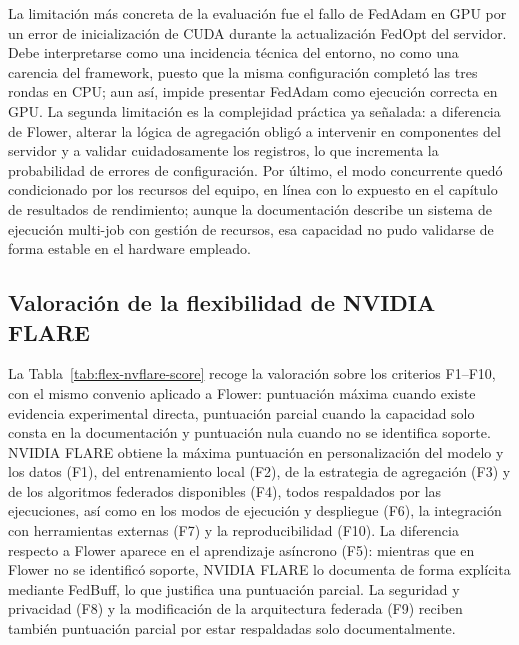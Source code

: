 La limitación más concreta de la evaluación fue el fallo de FedAdam en GPU por un
error de inicialización de CUDA durante la actualización FedOpt del servidor. Debe
interpretarse como una incidencia técnica del entorno, no como una carencia del
framework, puesto que la misma configuración completó las tres rondas en CPU; aun
así, impide presentar FedAdam como ejecución correcta en GPU. La segunda limitación
es la complejidad práctica ya señalada: a diferencia de Flower, alterar la lógica de
agregación obligó a intervenir en componentes del servidor y a validar
cuidadosamente los registros, lo que incrementa la probabilidad de errores de
configuración. Por último, el modo concurrente quedó condicionado por los recursos
del equipo, en línea con lo expuesto en el capítulo de resultados de rendimiento;
aunque la documentación describe un sistema de ejecución multi-job con gestión de
recursos, esa capacidad no pudo validarse de forma estable en el hardware empleado.

\subsection{Valoración de la flexibilidad de NVIDIA FLARE}\label{subsec:flex-nvflare-score}

La Tabla~\ref{tab:flex-nvflare-score} recoge la valoración sobre los criterios
F1--F10, con el mismo convenio aplicado a Flower: puntuación máxima cuando existe
evidencia experimental directa, puntuación parcial cuando la capacidad solo consta
en la documentación y puntuación nula cuando no se identifica soporte. NVIDIA FLARE
obtiene la máxima puntuación en personalización del modelo y los datos (F1), del
entrenamiento local (F2), de la estrategia de agregación (F3) y de los algoritmos
federados disponibles (F4), todos respaldados por las ejecuciones, así como en los
modos de ejecución y despliegue (F6), la integración con herramientas externas (F7)
y la reproducibilidad (F10). La diferencia respecto a Flower aparece en el
aprendizaje asíncrono (F5): mientras que en Flower no se identificó soporte, NVIDIA
FLARE lo documenta de forma explícita mediante FedBuff, lo que justifica una
puntuación parcial. La seguridad y privacidad (F8) y la modificación de la
arquitectura federada (F9) reciben también puntuación parcial por estar respaldadas
solo documentalmente.

